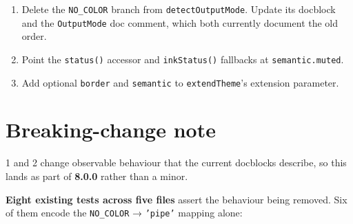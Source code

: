 \begin{enumerate}
\def\labelenumi{\arabic{enumi}.}
\tightlist
\item
  Delete the \texttt{N\allowbreak{}O\allowbreak{}\_\allowbreak{}C\allowbreak{}O\allowbreak{}L\allowbreak{}O\allowbreak{}R} branch from \texttt{d\allowbreak{}e\allowbreak{}t\allowbreak{}e\allowbreak{}c\allowbreak{}t\allowbreak{}O\allowbreak{}u\allowbreak{}t\allowbreak{}p\allowbreak{}u\allowbreak{}t\allowbreak{}M\allowbreak{}o\allowbreak{}d\allowbreak{}e}. Update its docblock and the \texttt{O\allowbreak{}u\allowbreak{}t\allowbreak{}p\allowbreak{}u\allowbreak{}t\allowbreak{}M\allowbreak{}o\allowbreak{}d\allowbreak{}e} doc comment, which both currently document the old order.
\item
  Point the \texttt{s\allowbreak{}t\allowbreak{}a\allowbreak{}t\allowbreak{}u\allowbreak{}s\allowbreak{}(\allowbreak{})} accessor and \texttt{i\allowbreak{}n\allowbreak{}k\allowbreak{}S\allowbreak{}t\allowbreak{}a\allowbreak{}t\allowbreak{}u\allowbreak{}s\allowbreak{}(\allowbreak{})} fallbacks at \texttt{s\allowbreak{}e\allowbreak{}m\allowbreak{}a\allowbreak{}n\allowbreak{}t\allowbreak{}i\allowbreak{}c\allowbreak{}.\allowbreak{}m\allowbreak{}u\allowbreak{}t\allowbreak{}e\allowbreak{}d}.
\item
  Add optional \texttt{b\allowbreak{}o\allowbreak{}r\allowbreak{}d\allowbreak{}e\allowbreak{}r} and \texttt{s\allowbreak{}e\allowbreak{}m\allowbreak{}a\allowbreak{}n\allowbreak{}t\allowbreak{}i\allowbreak{}c} to \texttt{e\allowbreak{}x\allowbreak{}t\allowbreak{}e\allowbreak{}n\allowbreak{}d\allowbreak{}T\allowbreak{}h\allowbreak{}e\allowbreak{}m\allowbreak{}e}'s extension parameter.
\end{enumerate}

\section{Breaking-change note}\label{record-147-breaking-change-note}

1 and 2 change observable behaviour that the current docblocks describe, so this lands as part of \textbf{8.0.0} rather than a minor.

\textbf{Eight existing tests across five files} assert the behaviour being removed. Six of them encode the \texttt{N\allowbreak{}O\allowbreak{}\_\allowbreak{}C\allowbreak{}O\allowbreak{}L\allowbreak{}O\allowbreak{}R} → \texttt{'\allowbreak{}p\allowbreak{}i\allowbreak{}p\allowbreak{}e\allowbreak{}'} mapping alone:



